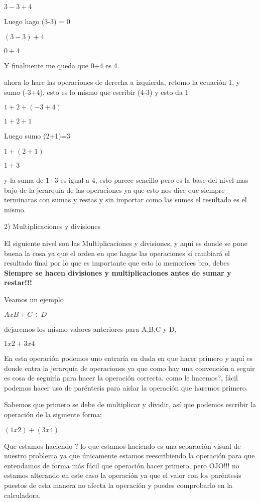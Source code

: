 \documentclass[10pt]{article}
\newcommand{\bt}[1]{\textbf{#1}}
\newcommand{\ec}[1]{\begin{center} $#1$ \end{center}}
\begin{document}

    \ec{3-3+4}

    Luego hago (3-3) = 0

    \ec{(3-3)+4}

    \ec{0+4}

    Y finalmente me queda que 0+4 es 4.

    ahora lo hare las operaciones de derecha a izquierda, retomo la ecuación 1, y sumo (-3+4), esto es lo mismo que escribir (4-3) y esto da 1 

    \ec{1+2+(-3+4)}

    \ec{1+2+1}

    Luego sumo (2+1)=3

    \ec{1+(2+1)}

    \ec{1+3}

    y la suma de 1+3 es igual a 4, esto parece sencillo pero es la base del nivel mas bajo de la jerarquía de las operaciones ya que esto nos dice que siempre terminaras con sumas y restas y sin importar como las sumes el resultado es el mismo.

    2) Multiplicaciones y divisiones

    El siguiente nivel son las Multiplicaciones y divisiones, y aquí es donde se pone buena la cosa ya que el orden en que hagas las operaciones si cambiará el resultado final por lo que es importante que esto lo memorices bro, debes \bt{Siempre se hacen divisiones y multiplicaciones antes de sumar y restar!!!}

    Veamos un ejemplo 

    \ec{AxB+C\div D}

    dejaremos los mismo valores anteriores para A,B,C y D, 

    \ec{1x2+3x4}

    En esta operación podemos uno entraría en duda en que hacer primero y aquí es donde entra la jerarquía de operaciones ya que como hay una convención a seguir es cosa de seguirla para hacer la operación correcta, como le hacemos?, fácil podemos hacer uso de paréntesis para aislar la operación que haremos primero.

    Sabemos que primero se debe de multiplicar y dividir, así que podemos escribir la operación de la siguiente forma;

    \ec{(1x2)+(3x4)}

    Que estamos haciendo ? lo que estamos haciendo es una separación visual de nuestro problema ya que únicamente estamos reescribiendo la operación para que entendamos de forma más fácil que operación hacer primero, pero OJO!!! no estamos alterando en este caso la operación ya que el valor con los paréntesis puestos de esta manera no afecta la operación y puedes comprobarlo en la calculadora.
\end{document}
